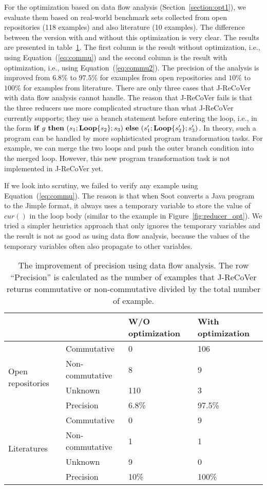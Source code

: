 \documentclass{llncs}
\newcommand{\cur}{cur()}
\newcommand{\ite}[3]{
	 \ifmmode
	 \mathbf{if}\ #1 \ \mathbf{then}\ #2\  \mathbf{else}\ #3
	 \else
	 \textbf{if}\ #1 \ \textbf{then}\ #2\  \textbf{else}\ #3
	 \fi}
\newcommand{\rloop}{
	\ifmmode
	\mathbf{Loop}
	\else
	\textbf{Loop}
	\fi}
\begin{document}
For the optimization based on data flow analysis (Section~\ref{section:opt1}), we evaluate them based on real-world benchmark sets collected from open repositories (118 examples) and also literature (10 examples). The difference between the version with and without this optimization is very clear. The results are presented in table~\ref{tab:opt1}. The first column is the result without optimization, i.e., using Equation~(\ref{eq:commu}) and the second column is the result with optimization, i.e., using Equation~(\ref{eq:commu2}). The precision of the analysis is improved from $6.8\%$ to $97.5\%$ for examples from open repositories and
$10\%$ to $100\%$ for examples from literature. There are only three cases that J-ReCoVer with data flow analysis cannot handle. The reason that J-ReCoVer fails is that the three reducers use more complicated structure than what J-ReCoVer currently supports; they use a branch statement before entering the loop, i.e., in the form $\ite{g}{(s_1;\rloop\{s_2\};s_3)}{(s'_1;\rloop\{s'_2\};s'_3)}$. In theory, such a program can be handled by more sophisticated program transformation tasks. For example, we can merge the two loops and push the outer branch condition into the merged loop.
However, this new program transformation task is not implemented in J-ReCoVer yet.

If we look into scrutiny, we failed to verify any example using Equation~(\ref{eq:commu}). The reason is that when Soot converts a Java program to the Jimple format, it always uses a temporary variable to store the value of $\cur$ in the loop body (similar to the example in Figure~\ref{fig:reducer_opt}). We tried a simpler heuristics approach that only ignores the temporary variables and the result is not as good as using data flow analysis, because the values of the temporary variables often also propagate to other variables.
\begin{table}[htb]
	\centering
	\begin{tabular}{|l|l|l|l|}
		\hline
		& &W/O optimization	& With optimization\\
		\hline
		\hline
		\multirow{4}{*}{Open repositories}&Commutative& 0&106\\
		\cline{2-4}
		&Non-commutative&8&9\\
		\cline{2-4}
		&Unknown&110&3\\
		\cline{2-4}
		&Precision& 6.8\% & 97.5\%\\
		\hline
		\hline
		\multirow{4}{*}{Literatures}&Commutative& 0&9\\
		\cline{2-4}
		&Non-commutative&1&1\\
		\cline{2-4}
		&Unknown&9&0\\
		\cline{2-4}
		&Precision& 10\% & 100\%\\
		\hline
	\end{tabular}
	\caption{The improvement of precision using data flow analysis. The row ``Precision'' is calculated as the number of examples that J-ReCoVer returns commutative or non-commutative divided by the total number of example.}
	\label{tab:opt1}
\end{table}
\end{document}
